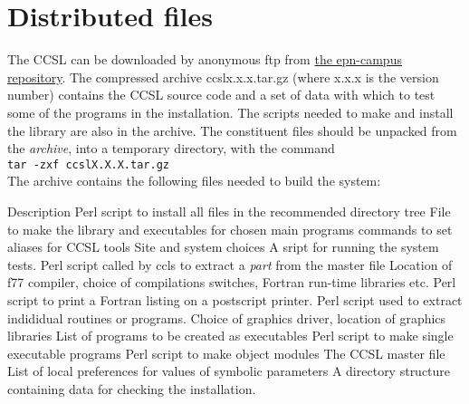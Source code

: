 \documentclass[onecolumn,twoside,11pt,a4paper]{report}
\begin{document}
{}
\appendix
\setcounter{chapter}{5}
\section{Distributed files}
The CCSL can be downloaded by anonymous ftp from \href{http://forge.epn-campus.eu/projects/sxtalsoft/repository/show/CCSL/source}{the epn-campus repository}.  The compressed
archive ccslx.x.x.tar.gz (where x.x.x is the version number) contains the
CCSL source code and a set of data with which to test some of the programs in the installation. The scripts needed to make and install the library  are also in the archive.  The constituent files should be
unpacked from the \emph{archive}, into a temporary directory, with the command\\
\texttt{tar -zxf ccslX.X.X.tar.gz}
\\[2ex]
The archive contains the following files needed to build the system:
\begin{listdirectory}
 {Description}
 {Perl script to install all files in the recommended 
directory tree}
 {File to make the library and executables for chosen
main programs}
 {commands to set aliases for CCSL tools}
 {Site and system choices}
 {A sript for running the system tests.}
 {Perl script called by ccls to extract a \emph{part} 
from the master file}
 {Location of f77 compiler, choice of
 compilations switches, Fortran run-time libraries etc.}
 {Perl script to print a Fortran listing on a postscript
printer.}
 {Perl script used to extract indididual routines 
or programs.}
 {Choice of graphics driver, location of
 graphics libraries}
 {List of programs to be created as 
executables}
 {Perl script to make single executable programs}
 {Perl script to make object modules}
 {The CCSL master file}
 {List of local preferences for values of symbolic 
parameters}
 {A directory structure containing data for checking the installation.} 
\end{listdirectory}\par
\end{document}
